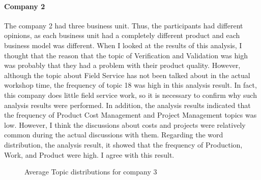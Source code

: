 \documentclass[senior]{IPSstyle}
\begin{document}
\paragraph{Company 2} The company 2 had three business unit. Thus, the participants had different opinions, as each business unit had a completely different product and each business model was different. When I looked at the results of this analysis, I thought that the reason that the topic of Verification and Validation was high was probably that they had a problem with their product quality. However, although the topic about Field Service has not been talked about in the actual workshop time, the frequency of topic 18 was high in this analysis result. In fact, this company does little field service work, so it is necessary to confirm why such analysis results were performed. In addition, the analysis results indicated that the frequency of Product Cost Management and Project Management topics was low. However, I think the discussions about costs and projects were relatively common during the actual discussions with them. Regarding the word distribution, the analysis result, it showed that the frequency of Production, Work, and Product were high. I agree with this result.

\begin{figure}[h]
    \begin{center}
    \end{center}
\vspace{-0.3cm}
    \caption{Average Topic distributions for company 3}
    \label{fig_c3}
    \vspace{-0.3cm}
\end{figure} 
\end{document}
